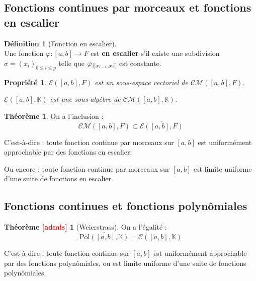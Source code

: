 \documentclass[12pt]{book}
\let\ensembleNombre\mathbb
\newcommand*\K{\ensuremath{\ensembleNombre{K}}}
\def\restriction#1#2{\mathchoice
				{\setbox1\hbox{${\displaystyle #1}_{\scriptstyle #2}$}
				\restrictionaux{#1}{#2}}
				{\setbox1\hbox{${\textstyle #1}_{\scriptstyle #2}$}
				\restrictionaux{#1}{#2}}
				{\setbox1\hbox{${\scriptstyle #1}_{\scriptscriptstyle #2}$}
				\restrictionaux{#1}{#2}}
				{\setbox1\hbox{${\scriptscriptstyle #1}_{\scriptscriptstyle #2}$}
				\restrictionaux{#1}{#2}}}
\def\restrictionaux#1#2{{#1\, \smash{\vrule height .8\ht1 depth .85\dp1}}_{\,#2}}
\newtheorem*{prop}{Propriété}
\theoremstyle{definition}
\newtheorem*{defi}{Définition}
\newtheorem{thme}{Théorème}[chapter]
\newtheorem*{thmead}{Théorème \textcolor{red}{[admis]}}
\theoremstyle{remark}
\newenvironment{fdef}
  {\begin{mdframed}[roundcorner=10pt, linewidth=1pt]\begin{defi}}
  {\end{defi}\end{mdframed}}
\newenvironment{fthme}
  {\begin{mdframed}[roundcorner=10pt, linewidth=2pt]\begin{thme}}
  {\end{thme}\end{mdframed}}
\newenvironment{fthmead}
  {\begin{mdframed}[roundcorner=10pt, linewidth=2pt]\begin{thmead}}
  {\end{thmead}\end{mdframed}}
\begin{document}
		\subsection{Fonctions continues par morceaux et fonctions en escalier}
	\begin{fdef}[Fonction en escalier]\mbox{~}\\
	Une fonction $\varphi : [a,b] \longrightarrow F$ est \textbf{en escalier} s'il existe une subdivision $\sigma = (x_i)_{0\leq i\leq p}$ telle que $\restriction{\varphi}{]x_{i-1}, x_i[}$ est constante.
	\end{fdef}
	
	\begin{prop}
	$\mathcal E([a,b], F)$ est un sous-espace vectoriel de $\mathcal {CM}([a,b], F)$.
	
	$\mathcal E([a,b], \K)$ est une sous-algèbre de $\mathcal {CM}([a,b], \K)$.
	\end{prop}
	
	\begin{fthme}
	On a l'inclusion :
	\[\mathcal{CM}([a,b], F) \subset \overline{\mathcal E([a,b], F)}\]
	
	\noindent C'est-à-dire : toute fonction continue par morceaux sur $[a,b]$ est uniformément approchable par des fonctions en escalier.
	
	\noindent Ou encore : toute fonction continue par morceaux sur $[a,b]$ est limite uniforme d'une suite de fonctions en escalier.
	\end{fthme}
	
		\subsection{Fonctions continues et fonctions polynômiales}
	
	\begin{fthmead}[Weierstrass]
	On a l'égalité :
	\[ \overline{\mathrm{Pol}([a,b], \K)} = \mathcal C([a,b], \K) \]
	
	\noindent C'est-à-dire : toute fonction continue sur $[a,b]$ est uniformément approchable par des fonctions polynômiales, ou est limite uniforme d'une suite de fonctions polynômiales.
	\end{fthmead}
		
\end{document}
